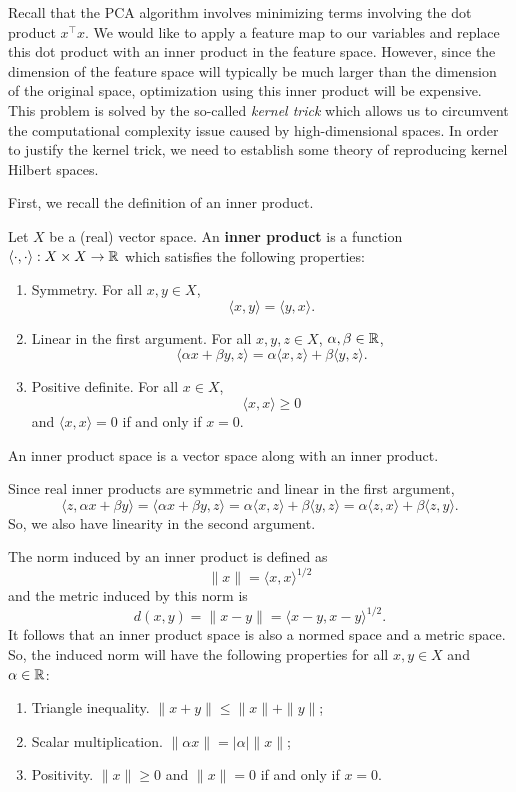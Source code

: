 Recall that the PCA algorithm involves minimizing terms involving the dot product \(x^\top x\).
We would like to apply a feature map to our variables and replace this dot product with an inner product in the feature space.
However, since the dimension of the feature space will typically be much larger than the dimension of the original space, optimization using this inner product will be expensive.
This problem is solved by the so-called \textit{kernel trick} which allows us to circumvent the computational complexity issue caused by high-dimensional spaces.
In order to justify the kernel trick, we need to establish some theory of reproducing kernel Hilbert spaces.

First, we recall the definition of an inner product.
\begin{definition}
    \cite[p. 10]{small1994hilbert}
    Let \(X\) be a (real) vector space.
    An \textbf{inner product} is a function \(\langle \cdot, \cdot \rangle : X \times X \to \mathbb{R}\) which satisfies the following properties:
    \begin{enumerate}
        \item Symmetry. For all \(x,y \in X\),
        \[\langle x,y \rangle = \langle y, x \rangle.\]
        \item Linear in the first argument. For all \(x,y,z \in X\), \(\alpha, \beta \in \mathbb{R}\),
        \[\langle \alpha x + \beta y, z \rangle = \alpha \langle x, z \rangle + \beta \langle y, z \rangle.\]
        \item Positive definite. For all \(x \in X\),
        \[\langle x, x \rangle \geq 0\]
        and \(\langle x, x \rangle = 0\) if and only if \(x = 0\).
    \end{enumerate}
    An inner product space is a vector space along with an inner product.
\end{definition}

Since real inner products are symmetric and linear in the first argument,
\[
    \langle z, \alpha x + \beta y\rangle
    = \langle \alpha x + \beta y, z \rangle
    = \alpha \langle x, z \rangle + \beta \langle y, z \rangle
    = \alpha \langle z, x \rangle + \beta \langle z, y \rangle
.\]
So, we also have linearity in the second argument.

The norm induced by an inner product is defined as
\[\|x\| = \langle x, x \rangle^{1/2}\]
and the metric induced by this norm is
\[d(x,y) = \|x - y\| = \langle x-y, x-y \rangle^{1/2}.\]
It follows that an inner product space is also a normed space and a metric space.
So, the induced norm will have the following properties for all \(x,y \in X\) and \(\alpha \in \mathbb{R}\):
\begin{enumerate}
    \item Triangle inequality. \(\|x + y \| \leq \|x\| + \|y\|\);
    \item Scalar multiplication. \(\|\alpha x\| = |\alpha| \|x\|\);
    \item Positivity. \(\|x\| \geq 0\) and \(\|x\| = 0\) if and only if \(x = 0\). 
\end{enumerate}

